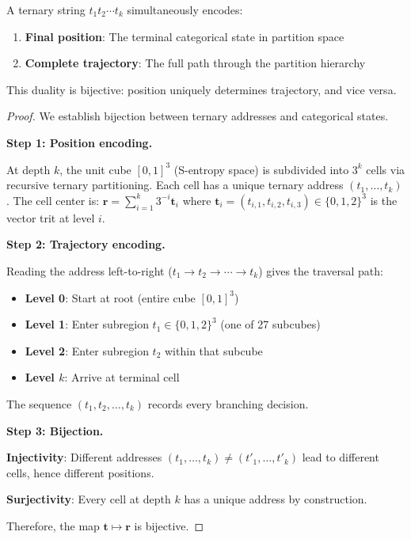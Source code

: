 \begin{theorem}
\label{thm:duality}
A ternary string $t_1 t_2 \cdots t_k$ simultaneously encodes:
\begin{enumerate}
    \item \textbf{Final position}: The terminal categorical state in partition space
    \item \textbf{Complete trajectory}: The full path through the partition hierarchy
\end{enumerate}
This duality is bijective: position uniquely determines trajectory, and vice versa.
\end{theorem}



\begin{proof}
We establish bijection between ternary addresses and categorical states.

\textbf{Step 1: Position encoding.}

At depth $k$, the unit cube $[0,1]^3$ (S-entropy space) is subdivided into $3^k$ cells via recursive ternary partitioning. Each cell has a unique ternary address $(t_1, \ldots, t_k)$. The cell center is:
$
\mathbf{r} = \sum_{i=1}^{k} 3^{-i} \mathbf{t}_i
$
where $\mathbf{t}_i = (t_{i,1}, t_{i,2}, t_{i,3}) \in \{0, 1, 2\}^3$ is the vector trit at level $i$.

\textbf{Step 2: Trajectory encoding.}

Reading the address left-to-right ($t_1 \to t_2 \to \cdots \to t_k$) gives the traversal path:
\begin{itemize}
    \item \textbf{Level 0}: Start at root (entire cube $[0,1]^3$)
    \item \textbf{Level 1}: Enter subregion $t_1 \in \{0, 1, 2\}^3$ (one of 27 subcubes)
    \item \textbf{Level 2}: Enter subregion $t_2$ within that subcube
    \item \textbf{Level $k$}: Arrive at terminal cell
\end{itemize}
The sequence $(t_1, t_2, \ldots, t_k)$ records every branching decision.

\textbf{Step 3: Bijection.}

\textbf{Injectivity}: Different addresses $(t_1, \ldots, t_k) \neq (t'_1, \ldots, t'_k)$ lead to different cells, hence different positions.

\textbf{Surjectivity}: Every cell at depth $k$ has a unique address by construction.

Therefore, the map $\mathbf{t} \mapsto \mathbf{r}$ is bijective.
\end{proof}

